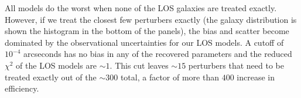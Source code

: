 All models do the worst when none of the LOS galaxies are treated exactly. However, if we treat the closest few perturbers exactly (the galaxy distribution is shown the histogram in the bottom of the panels), the bias and scatter become dominated by the observational uncertainties for our LOS models. A cutoff of $10^{-4}$ arcseconds has no bias in any of the recovered parameters and the reduced $\chi^2$ of the LOS models are $\sim 1$. This cut leaves $\sim 15$ perturbers that need to be treated exactly out of the $\sim 300$ total, a factor of more than $400$ increase in efficiency.
  
  
  